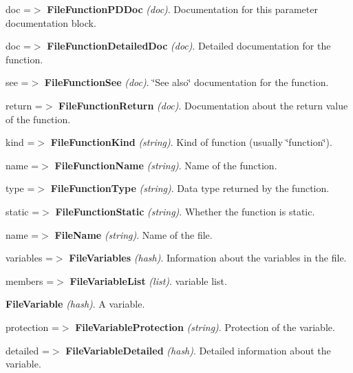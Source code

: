 \begin{DoxyItemize}
\begin{DoxyItemize}
\begin{DoxyItemize}
\begin{DoxyItemize}
\begin{DoxyItemize}
\begin{DoxyItemize}
\begin{DoxyItemize}
\begin{DoxyItemize}
\begin{DoxyItemize}
\begin{DoxyItemize}
\begin{DoxyItemize}
\end{DoxyItemize}
\item doc =$>$ {\bfseries FileFunctionPDDoc} {\itshape (doc)\/}. Documentation for this parameter documentation block. 
\end{DoxyItemize}
\end{DoxyItemize}
\item doc =$>$ {\bfseries FileFunctionDetailedDoc} {\itshape (doc)\/}. Detailed documentation for the function. 
\item see =$>$ {\bfseries FileFunctionSee} {\itshape (doc)\/}. \char`\"{}See also\char`\"{} documentation for the function. 
\item return =$>$ {\bfseries FileFunctionReturn} {\itshape (doc)\/}. Documentation about the return value of the function. 
\end{DoxyItemize}
\item kind =$>$ {\bfseries FileFunctionKind} {\itshape (string)\/}. Kind of function (usually \char`\"{}function\char`\"{}). 
\item name =$>$ {\bfseries FileFunctionName} {\itshape (string)\/}. Name of the function. 
\item type =$>$ {\bfseries FileFunctionType} {\itshape (string)\/}. Data type returned by the function. 
\item static =$>$ {\bfseries FileFunctionStatic} {\itshape (string)\/}. Whether the function is static. 
\end{DoxyItemize}
\end{DoxyItemize}
\end{DoxyItemize}
\item name =$>$ {\bfseries FileName} {\itshape (string)\/}. Name of the file. 
\item variables =$>$ {\bfseries FileVariables} {\itshape (hash)\/}. Information about the variables in the file. 
\begin{DoxyItemize}
\item members =$>$ {\bfseries FileVariableList} {\itshape (list)\/}. variable list. 
\begin{DoxyItemize}
\item {\bfseries FileVariable} {\itshape (hash)\/}. A variable. 
\begin{DoxyItemize}
\item protection =$>$ {\bfseries FileVariableProtection} {\itshape (string)\/}. Protection of the variable. 
\item detailed =$>$ {\bfseries FileVariableDetailed} {\itshape (hash)\/}. Detailed information about the variable. 

\end{DoxyItemize}
\end{DoxyItemize}
\end{DoxyItemize}
\end{DoxyItemize}
\end{DoxyItemize}
\end{DoxyItemize}
\end{DoxyItemize}
